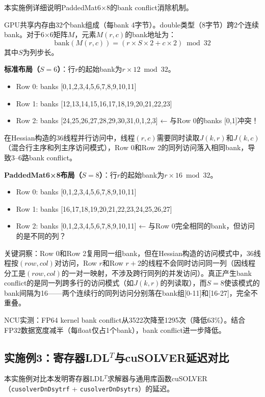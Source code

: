 \documentclass[a4paper,12pt]{ctexart}
\begin{document}
本实施例详细说明PaddedMat6×8的bank conflict消除机制。

GPU共享内存由32个bank组成（每bank 4字节）。double类型（8字节）跨2个连续bank。对于6×6矩阵$M$，元素$M(r,c)$的bank地址为：
\begin{equation}
\text{bank}(M(r,c))=(r\times S\times 2+c\times 2)\bmod 32
\end{equation}
其中$S$为列步长。

\textbf{标准布局（$S=6$）}：行$r$的起始bank为$r\times12\bmod 32$。
\begin{itemize}
    \item Row 0: banks [0,1,2,3,4,5,6,7,8,9,10,11]
    \item Row 1: banks [12,13,14,15,16,17,18,19,20,21,22,23]
    \item Row 2: banks [24,25,26,27,28,29,30,31,0,1,2,3] ← 与Row 0的banks [0,1]冲突！
\end{itemize}
在Hessian构造的36线程并行访问中，线程$(r,c)$需要同时读取$J(k,r)$和$J(k,c)$（混合行主序和列主序访问模式），Row 0和Row 2的同列访问落入相同bank，导致3--6路bank conflict。

\textbf{PaddedMat6×8布局（$S=8$）}：行$r$的起始bank为$r\times16\bmod 32$。
\begin{itemize}
    \item Row 0: banks [0,1,2,3,4,5,6,7,8,9,10,11]
    \item Row 1: banks [16,17,18,19,20,21,22,23,24,25,26,27]
    \item Row 2: banks [0,1,2,3,4,5,6,7,8,9,10,11] ← 与Row 0完全相同的bank，但访问的是不同的列？
\end{itemize}
关键洞察：Row 0和Row 2复用同一组bank，但在Hessian构造的访问模式中，36线程按$(row,col)$对访问，Row $r$和Row $r+2$的线程不会同时访问同一列（因线程分工是$(row,col)$的一对一映射，不涉及跨行同列的并发访问）。真正产生bank conflict的是同一列跨多行的访问模式（如$J(k,r)$的列读取），而$S=8$使该模式的bank间隔为16——两个连续行的同列访问分别落在bank组[0-11]和[16-27]，完全不重叠。

NCU实测：FP64 kernel bank conflict从3522次降至1295次（降低63\%）。结合FP32数据宽度减半（每float仅占1个bank），bank conflict进一步降低。

\subsection{实施例3：寄存器LDL$^T$与cuSOLVER延迟对比}

本实施例对比本发明寄存器LDL$^T$求解器与通用库函数cuSOLVER（\texttt{cusolverDnDsytrf} + \texttt{cusolverDnDsytrs}）的延迟。
\end{document}
